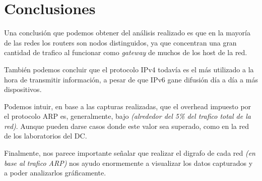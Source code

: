 \section{Conclusiones}

Una conclusión que podemos obtener del análisis realizado es que en la mayoría de las redes los routers son nodos distinguidos, ya que concentran una gran cantidad de trafico al funcionar como \textit{gateway} de muchos de los host de la red.

También podemos concluir que el protocolo IPv4 todavía es el más utilizado a la hora de transmitir información, a pesar de que IPv6 gane difusión día a día a más dispositivos.

Podemos intuir, en base a las capturas realizadas, que el overhead impuesto por el protocolo ARP es, generalmente, bajo \textit{(alrededor del 5\% del trafico total de la red)}. Aunque pueden darse casos donde este valor sea superado, como en la red de los laboratorios del DC.

Finalmente, nos parece importante señalar que realizar el digrafo de cada red \textit{(en base al trafico ARP)} nos ayudo enormemente a visualizar los datos capturados y a poder analizarlos gráficamente.